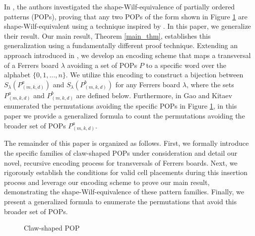 \documentclass[12pt, english, a4paper]{article}
\theoremstyle{plain}
\theoremstyle{definition}
\theoremstyle{remark}
\begin{document}
In \cite{burstein-shape-wilf}, the authors investigated the shape-Wilf-equivalence of partially ordered patterns (POPs), proving that any two POPs of the form shown in Figure \ref{Fig1} are shape-Wilf-equivalent using a technique inspired by \cite{bwx-main}. In this paper, we generalize their result. Our main result, Theorem \ref{main_thm}, establishes this generalization using a fundamentally different proof technique. Extending an approach introduced in \cite{SUK-arxiv}, we develop an encoding scheme that maps a transversal of a Ferrers board $\lambda$ avoiding a set of POPs $P$ to a specific word over the alphabet $\{0, 1, \dots, n\}$. We utilize this encoding to construct a bijection between $S_{\lambda}(P^a_{(m,k,d)})$ and $S_{\lambda}(P^b_{(m,k,d)})$ for any Ferrers board $\lambda$, where the sets $P^a_{(m,k,d)}$ and $P^b_{(m,k,d)}$ are defined below. Furthermore, in \cite{gao-kitaev-length-4-5-pops}  Gao and Kitaev enumerated the permutations avoiding the specific POPs in Figure \ref{Fig1}, in this paper we provide a generalized formula to count the permutations avoiding the broader set of POPs $P^a_{(m,k,d)}$.

The remainder of this paper is organized as follows. First, we formally introduce the specific families of claw-shaped POPs under consideration and detail our novel, recursive encoding process for transversals of Ferrers boards. Next, we rigorously establish the conditions for valid cell placements during this insertion process and leverage our encoding scheme to prove our main result, demonstrating the shape-Wilf-equivalence of these pattern families. Finally, we present a generalized formula to enumerate the permutations that avoid this broader set of POPs. 
\begin{figure}[!htbp]

   \centering
{
}
\caption{Claw-shaped POP}  
\label{Fig1}
 \end{figure}
\end{document}
